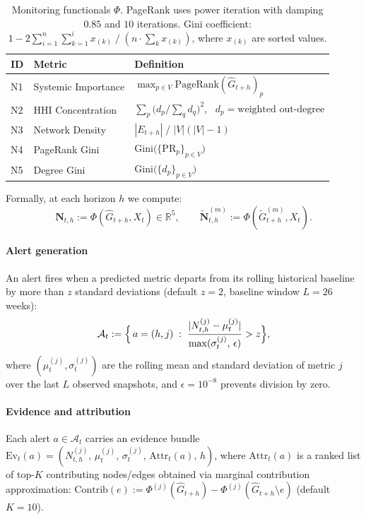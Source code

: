 \begin{table}[!t]
\centering
\footnotesize
\setlength{\tabcolsep}{4pt}
\begin{tabularx}{\textwidth}{@{}llX@{}}
\toprule
ID & Metric & Definition \\
\midrule
N1 & Systemic Importance & $\max_{p\in V} \mathrm{PageRank}(\widehat{G}_{t+h})_p$ \\
N2 & HHI Concentration & $\sum_p \bigl(d_p / \textstyle\sum_q d_q\bigr)^2$, \ $d_p = \text{weighted out-degree}$ \\
N3 & Network Density & $|E_{t+h}| \;/\; |V|(|V|-1)$ \\
N4 & PageRank Gini & $\mathrm{Gini}\!\bigl(\{\mathrm{PR}_p\}_{p\in V}\bigr)$ \\
N5 & Degree Gini & $\mathrm{Gini}\!\bigl(\{d_p\}_{p\in V}\bigr)$ \\
\bottomrule
\end{tabularx}
\caption{Monitoring functionals $\Phi$. PageRank uses power iteration with damping $0.85$ and $10$ iterations. Gini coefficient: $1 - 2\sum_{i=1}^{n}\sum_{k=1}^{i}x_{(k)} \;/\; (n \cdot \sum_k x_{(k)})$, where $x_{(k)}$ are sorted values.}
\label{tab:metrics}
\end{table}

\noindent Formally, at each horizon $h$ we compute:
\begin{equation}
\label{eq:monitor_metrics}
\mathbf{N}_{t,h} := \Phi(\widehat{G}_{t+h},X_t)\in\mathbb{R}^5,\qquad
\widetilde{\mathbf{N}}^{(m)}_{t,h} := \Phi(\widetilde{G}^{(m)}_{t+h},X_t).
\end{equation}

\paragraph{Alert generation}
An alert fires when a predicted metric departs from its rolling historical baseline by more than $z$ standard deviations (default $z=2$, baseline window $L=26$ weeks):
\begin{equation}
\label{eq:alert_trigger}
\mathcal{A}_t :=
\Bigl\{\, a=(h,j)\;:\; \frac{|N_{t,h}^{(j)} - \mu_t^{(j)}|}{\max(\sigma_t^{(j)},\,\epsilon)} > z \Bigr\},
\end{equation}
where $(\mu_t^{(j)},\sigma_t^{(j)})$ are the rolling mean and standard deviation of metric $j$ over the last $L$ observed snapshots, and $\epsilon=10^{-8}$ prevents division by zero.

\paragraph{Evidence and attribution}
Each alert $a\in\mathcal{A}_t$ carries an evidence bundle $\mathrm{Ev}_t(a) = ( N_{t,h}^{(j)},\, \mu_t^{(j)},\, \sigma_t^{(j)},\, \mathrm{Attr}_t(a),\, h )$, where $\mathrm{Attr}_t(a)$ is a ranked list of top-$K$ contributing nodes/edges obtained via marginal contribution approximation: $\mathrm{Contrib}(e) := \Phi^{(j)}(\widehat{G}_{t+h}) - \Phi^{(j)}(\widehat{G}_{t+h}\setminus e)$ (default $K=10$).

